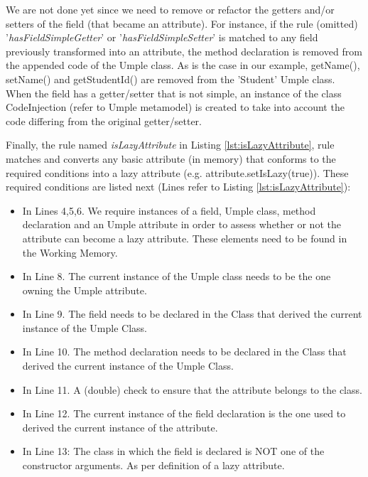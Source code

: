 We are not done yet since we need to remove or refactor the getters  and/or setters of the field (that became an attribute). For instance, if the rule (omitted) '\textit{hasFieldSimpleGetter}' or '\textit{hasFieldSimpleSetter}' is matched to any field previously transformed into an attribute, the method declaration is removed from the appended code of the Umple class. As is the case in our example, getName(), setName() and getStudentId() are removed from the 'Student' Umple class.
When the field has a getter/setter that is not simple, an instance of the class CodeInjection (refer to Umple metamodel) is created to take into account the code differing from the original getter/setter.

Finally, the rule named \textit{isLazyAttribute} in Listing \ref{lst:isLazyAttribute},  rule matches and converts any basic attribute (in memory) that conforms to the required conditions into a lazy attribute (e.g. attribute.setIsLazy(true)). These required conditions are listed next (Lines refer to Listing \ref{lst:isLazyAttribute}): 

\begin{itemize} 
\item In Lines 4,5,6. We require instances of a field, Umple class, method declaration and an Umple attribute in order to assess whether or not the attribute can become a lazy attribute. These elements need to be found in the Working Memory. 
\item In Line 8. The current instance of the Umple class needs to be the one owning the Umple attribute.
\item In Line 9. The field needs to be declared in the Class that derived the current instance of the Umple Class.
\item In Line 10. The method declaration needs to be declared in the Class that derived the current instance of the Umple Class.
\item In Line 11. A (double) check to ensure that the attribute belongs to the class.
\item In Line 12. The current instance of the field declaration is the one used to derived the current instance of the attribute.
\item In Line 13: The class in which the field is declared is NOT one of the constructor arguments. As per definition of a lazy attribute.
\end{itemize}

